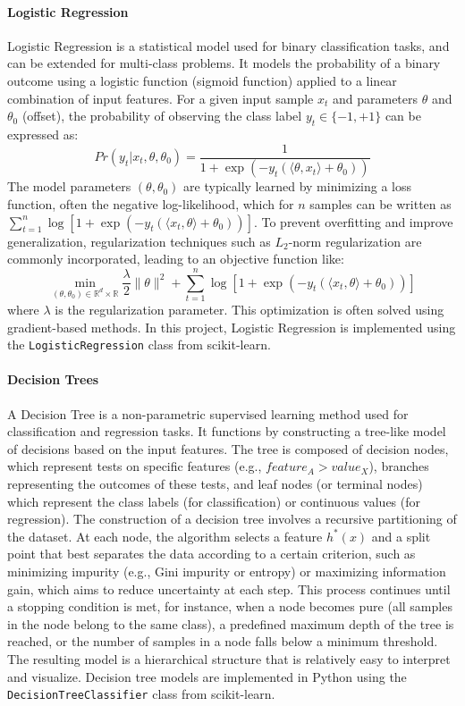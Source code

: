 \documentclass{article}
\begin{document}
\paragraph{Logistic Regression} Logistic Regression is a statistical model used for binary classification tasks, and can be extended for multi-class problems. It models the probability of a binary outcome using a logistic function (sigmoid function) applied to a linear combination of input features. For a given input sample $x_t$ and parameters $\theta$ and $\theta_0$ (offset), the probability of observing the class label $y_t \in \{-1, +1\}$ can be expressed as:
$$ Pr(y_{t}|x_{t},\theta,\theta_{0}) = \frac{1}{1+\exp(-y_{t}(\langle\theta,x_{t}\rangle+\theta_{0}))} $$
The model parameters $(\theta, \theta_0)$ are typically learned by minimizing a loss function, often the negative log-likelihood, which for $n$ samples can be written as $\sum_{t=1}^{n}\log[1+\exp(-y_{t}(\langle x_{t},\theta\rangle+\theta_{0}))]$. To prevent overfitting and improve generalization, regularization techniques such as $L_2$-norm regularization are commonly incorporated, leading to an objective function like:
$$ \min_{(\theta,\theta_{0})\in\mathbb{R}^{d}\times\mathbb{R}}\frac{\lambda}{2}\|\theta\|^{2}+\sum_{t=1}^{n}\log[1+\exp(-y_{t}(\langle x_{t},\theta\rangle+\theta_{0}))] $$
where $\lambda$ is the regularization parameter. This optimization is often solved using gradient-based methods. In this project, Logistic Regression is implemented using the \texttt{LogisticRegression} class from scikit-learn.

\paragraph{Decision Trees} A Decision Tree is a non-parametric supervised learning method used for classification and regression tasks. It functions by constructing a tree-like model of decisions based on the input features. The tree is composed of decision nodes, which represent tests on specific features (e.g., $feature_A > value_X$), branches representing the outcomes of these tests, and leaf nodes (or terminal nodes) which represent the class labels (for classification) or continuous values (for regression). The construction of a decision tree involves a recursive partitioning of the dataset. At each node, the algorithm selects a feature $h^*(x)$ and a split point that best separates the data according to a certain criterion, such as minimizing impurity (e.g., Gini impurity or entropy) or maximizing information gain, which aims to reduce uncertainty at each step. This process continues until a stopping condition is met, for instance, when a node becomes pure (all samples in the node belong to the same class), a predefined maximum depth of the tree is reached, or the number of samples in a node falls below a minimum threshold. The resulting model is a hierarchical structure that is relatively easy to interpret and visualize. Decision tree models are implemented in Python using the \texttt{DecisionTreeClassifier} class from scikit-learn.
\end{document}
